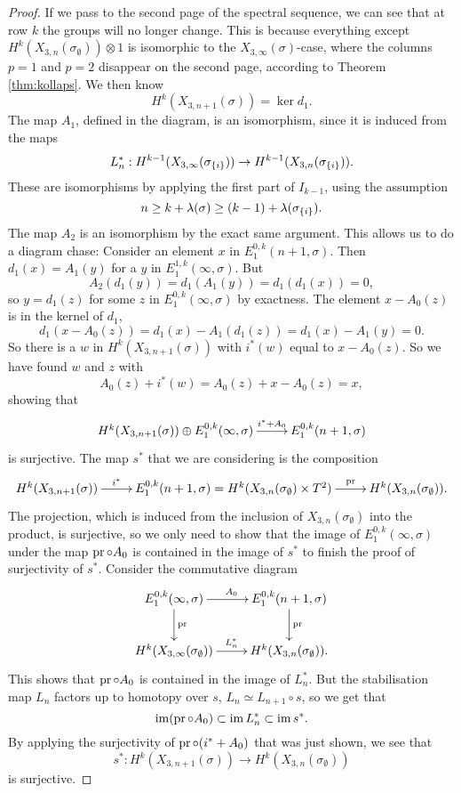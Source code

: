 \begin{proof}
  If we pass to the second page of the spectral sequence, we
  can see that at row $k$ the groups will no longer change. This is
  because everything except $H^k(X_{3,n}(\sigma_{\emptyset}))\otimes 1$ is
  isomorphic to the $X_{3,\infty}(\sigma)$-case, where the columns $p=1$
  and $p=2$ disappear on the second page, according to Theorem
  \ref{thm:kollaps}. We then know
  \[ H^k(X_{3,n+1}(\sigma)) = \ker d_1. \]
  The map $A_1$, defined in the diagram, is an isomorphism, since it
  is induced from the maps
  \[ L^*_{n} : H^{k-1}(X_{3,\infty}(\sigma_{\left\{ i \right\}})) \to
  H^{k-1}(X_{3,n}(\sigma_{\left\{ i \right\}})). \]
  These are isomorphisms by applying the first part of $I_{k-1}$,
  using the assumption 
  \[ n \geq k+\lambda(\sigma) \geq
  (k-1)+\lambda(\sigma_{\left\{ i \right\}}). \]
  The map $A_2$ is an isomorphism by the exact same argument.
  This allows us to do a diagram chase: Consider an element $x$ in
  $E_1^{0,k}(n+1,\sigma)$. Then $d_1(x) = A_1(y)$ for a $y$ in
  $E_1^{1,k}(\infty,\sigma)$. But 
  \[ A_2(d_1(y)) = d_1(A_1(y)) = d_1(d_1(x)) = 0, \]
  so $y = d_1(z)$ for some $z$ in $E_1^{0,k}(\infty,\sigma)$ by
  exactness. The element $x - A_0(z)$ is in the kernel of $d_1$,
  \[ d_1(x - A_0(z)) = d_1(x) - A_1(d_1(z)) = d_1(x) - A_1(y) = 0. \]
  So there is a $w$ in $H^k(X_{3,n+1}(\sigma))$ with $i^*(w)$ equal to
  $x-A_0(z)$. So we have found $w$ and $z$ with
  \[ A_0(z) + i^*(w) = A_0(z) + x - A_0(z) = x, \]
  showing that
  \[ \xymatrix{ H^k(X_{3,n+1}(\sigma)) \oplus E_1^{0,k}(\infty,\sigma)
    \ar[r]^-{i^* + A_0} & E_1^{0,k}(n+1,\sigma) } \]
  is surjective. The map $s^*$ that we are considering is the
  composition
  \[ \xymatrix{ H^k(X_{3,n+1}(\sigma)) \ar[r]^-{i^*} &
    E_1^{0,k}(n+1,\sigma) = H^k(X_{3,n}(\sigma_{\emptyset})\times T^2)
    \ar[r]^-{\pr} & H^k(X_{3,n}(\sigma_{\emptyset})). } \]
  The projection, which is induced from the inclusion of
  $X_{3,n}(\sigma_{\emptyset})$ into the product, is surjective, so we
  only need to show that the image of
  $E_1^{0,k}(\infty,\sigma)$ under the map $\operatorname{pr}\circ A_0$ is contained
  in the image of $s^*$ to
  finish the proof of surjectivity of $s^*$. Consider the commutative
  diagram
  \[ \xymatrix{ E_1^{0,k}(\infty,\sigma) \ar[r]^{A_0} \ar[d]^{\pr}
    & E_1^{0,k}(n+1,\sigma) \ar[d]^{\pr} \\
    H^k(X_{3,\infty}(\sigma_{\emptyset})) \ar[r]^{L_n^*} &
    H^k(X_{3,n}(\sigma_{\emptyset})). } \]
  This shows that $\operatorname{pr}\circ A_0$ is contained in the image of
  $L_n^*$. But the stabilisation map $L_n$ factors up to homotopy over
  $s$, $L_n \simeq L_{n+1}\circ s$, so we get that
  \[ \operatorname{im}(\operatorname{pr}\circ A_0) \subset \operatorname{im} L_n^* \subset \operatorname{im} s^*. \]
  By applying the surjectivity of $\operatorname{pr}\circ (i^*+A_0)$ that was just
  shown, we see that
  \[  s^* : H^k(X_{3,n+1}(\sigma)) \to
  H^k(X_{3,n}(\sigma_{\emptyset})) \] 
  is surjective.
  

\end{proof}
